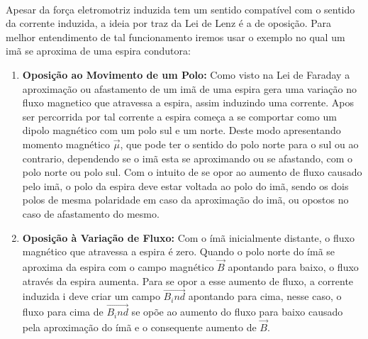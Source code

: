 \documentclass[a4paper, 12pt]{article}
\begin{document}
\paragraph{}Apesar da força eletromotriz induzida tem um sentido compatível com o sentido da corrente induzida, a ideia por traz da Lei de Lenz é a de oposição. Para melhor entendimento de tal funcionamento iremos usar o exemplo no qual um imã se aproxima de uma espira condutora:
\begin{enumerate}
    \item \textbf{Oposição ao Movimento de um Polo:} Como visto na Lei de Faraday a aproximação ou afastamento de um imã de uma espira gera uma variação no fluxo magnetico que atravessa a espira, assim induzindo uma corrente. Apos ser percorrida por tal corrente a espira começa a se comportar como um dipolo magnético com um polo sul e um norte. Deste modo apresentando momento magnético $\overrightarrow{\mu}$, que pode ter o sentido do polo norte para o sul ou ao contrario, dependendo se o imã esta se aproximando ou se afastando, com o polo norte ou polo sul. Com o intuito de se opor ao aumento de fluxo causado pelo imã, o polo da espira deve estar voltada ao polo do imã, sendo os dois polos de mesma polaridade em caso da aproximação do imã, ou opostos no caso de afastamento do mesmo.
    \item \textbf{Oposição à Variação de Fluxo:} Com o ímã inicialmente distante, o fluxo magnético que atravessa a espira é zero. Quando o polo norte do ímã se aproxima da espira com o campo magnético $\overrightarrow{B}$ apontando para baixo, o fluxo através da espira aumenta. Para se opor a esse aumento de fluxo, a corrente induzida i deve criar um campo $\overrightarrow{B_ind}$ apontando para cima, nesse caso, o fluxo para cima de $\overrightarrow{B_ind}$ se opõe ao aumento do fluxo para baixo causado pela aproximação do ímã e o consequente aumento de $\overrightarrow{B}$.
\end{enumerate}
\end{document}
